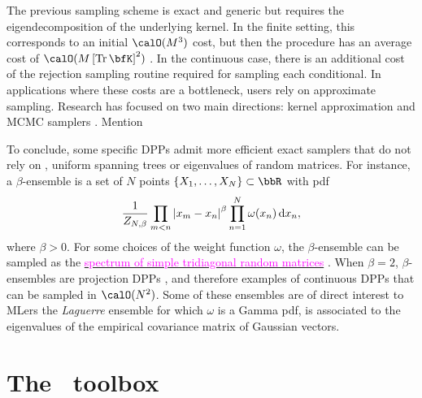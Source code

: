 \documentclass[twoside,11pt]{article}
\begin{document}
        The previous sampling scheme is exact and generic but requires the eigendecomposition of the underlying kernel.
        In the finite setting, this corresponds to an initial $\calO(M^3)$ cost, but then the procedure has an average cost of $\calO(M\lrb{\Tr \bfK}^2)$
        \citep{TrBaAm18}.
        In the continuous case, there is an additional cost of the rejection sampling routine required for sampling each conditional.
        In applications where these costs are a bottleneck, users rely on approximate sampling.
        Research has focused on two main directions: kernel approximation \citep{AKFT13} and MCMC samplers \citep{AnGhRe16, LiJeSr16c, GaBaVa17}.
        Mention \citep{Pou19,DeCaVa19}

        To conclude, some specific DPPs admit more efficient exact samplers that do not rely on , \eg uniform spanning trees \citep{PrWi98} or eigenvalues of random matrices.
        For instance, a $\beta$-ensemble is a set of $N$ points $\{X_1,\dots,X_N\}\subset \bbR$ with pdf
        \begin{equation*}
        \label{eq:beta_ensemble_pdf}
        \frac{1}{Z_{N,\beta}}
        \prod_{m< n}
            \left| x_m-x_n \right|^{\beta}
        \prod_{n= 1}^N
            \omega(x_n)
            \mathop{}\!\mathrm{d} x_n,
        \end{equation*}
        where $\beta>0$.
        For some choices of the weight function $\omega$, the $\beta$-ensemble can be sampled as the \href{https://dppy.readthedocs.io/en/latest/continuous_dpps/beta_ensembles.banded_models.html}{\textcolor{magenta}{spectrum of simple tridiagonal random matrices}} \citep{DuEd02,KiNe04}.
        When $\beta=2$, $\beta$-ensembles are projection DPPs \citep{Kon05}, and therefore examples of continuous DPPs that can be sampled in $\calO(N^2)$.
        Some of these ensembles are of direct interest to MLers \eg the \emph{Laguerre} ensemble for which $\omega$ is a Gamma pdf, is associated to the eigenvalues of the empirical covariance matrix of \iid Gaussian vectors.



\section{The \DPPy\ toolbox} %
\label{sec:the_dppy_toolbox}
\end{document}
